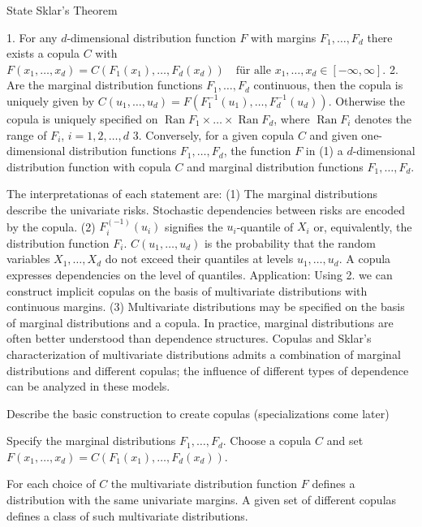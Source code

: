 State Sklar's Theorem

1. 
For any \(d\)-dimensional distribution function \(F\) with margins \(F_1, \ldots, F_d\) there exists a copula \(C\) with
\(
F(x_1, \ldots, x_d) = C(F_1(x_1), \ldots, F_d(x_d)) \quad \text{für alle } x_1, \ldots, x_d \in [-\infty, \infty].
\)
2.
Are the marginal distribution functions \(F_1, \ldots, F_d\) continuous, then the copula is uniquely given by
\(
C(u_1, \ldots, u_d) = F(F_1^{-1}(u_1), \ldots, F_d^{-1}(u_d)).
\)
Otherwise the copula is uniquely specified on \(\operatorname{Ran} F_1 \times \ldots \times \operatorname{Ran} F_d\), where 
\(\operatorname{Ran} F_i\) denotes the range of \(F_i\), \(i = 1, 2, \ldots, d\)
3.
Conversely, for a given copula \(C\) and given one-dimensional distribution functions \(F_1, \ldots, F_d\), 
the function \(F\) in (1) a \(d\)-dimensional distribution function with copula \(C\) and marginal distribution functions \(F_1, \ldots, F_d\).

The interpretationas of each statement are:
(1)
The marginal distributions describe the univariate risks.
Stochastic dependencies between risks are encoded by the copula.
(2)
\(F_i^{(-1)}(u_i)\) signifies the \(u_i\)-quantile of \(X_i\) or, equivalently, the distribution function \(F_i\).
\(C(u_1, \ldots, u_d)\) is the probability that the random variables \(X_1, \ldots, X_d\) do not exceed their quantiles at levels \(u_1, \ldots, u_d\).
A copula expresses dependencies on the level of quantiles.
Application: Using 2. we can construct implicit copulas on the basis of multivariate distributions with continuous margins.
(3)
Multivariate distributions may be specified on the basis of marginal distributions and a copula.
In practice, marginal distributions are often better understood than dependence structures. 
Copulas and Sklar's characterization of multivariate distributions admits a combination of marginal distributions and different copulas; 
the influence of different types of dependence can be analyzed in these models.

Describe the basic construction to create copulas (specializations come later)


Specify the marginal distributions \(F_1, \ldots, F_d\).
Choose a copula \(C\) and set \(F(x_1, \ldots, x_d) = C(F_1(x_1), \ldots, F_d(x_d)).\)

For each choice of \(C\) the multivariate distribution function \(F\) defines a distribution with the same univariate margins.
A given set of different copulas defines a class of such multivariate distributions.

